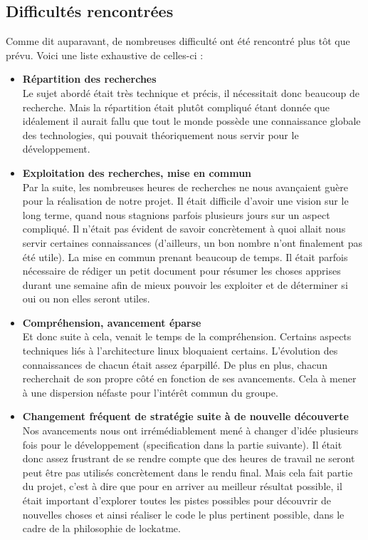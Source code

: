 \documentclass[french]{report}
\begin{document}
\subsection{Difficultés rencontrées}
Comme dit auparavant, de nombreuses difficulté ont été rencontré plus tôt que prévu.
Voici une liste exhaustive de celles-ci :

\vspace{0.5cm}
\begin{itemize}
  \item{\textbf{Répartition des recherches}}\\
Le sujet abordé était très technique et précis, il nécessitait donc beaucoup de
recherche. Mais la répartition était plutôt compliqué étant donnée que idéalement
il aurait fallu que tout le monde possède une connaissance globale des technologies,
qui pouvait théoriquement nous servir pour le développement.\\

  \item{\textbf{Exploitation des recherches, mise en commun}}\\
Par la suite, les nombreuses heures de recherches ne nous avançaient guère pour la
réalisation de notre projet. Il était difficile d'avoir une vision sur le long
terme, quand nous stagnions parfois plusieurs jours sur un aspect compliqué. Il
n'était pas évident de savoir concrètement à quoi allait nous servir certaines
connaissances (d'ailleurs, un bon nombre n'ont finalement pas été utile). La mise
en commun prenant beaucoup de temps. Il était parfois nécessaire de rédiger un
petit document pour résumer les choses apprises durant une semaine afin de mieux
pouvoir les exploiter et de déterminer si oui ou non elles seront utiles.\\

  \item{\textbf{Compréhension, avancement éparse}}\\
Et donc suite à cela, venait le temps de la compréhension. Certains aspects techniques
liés à l'architecture linux bloquaient certains. L'évolution des connaissances de
chacun était assez éparpillé. De plus en plus, chacun recherchait de son propre
côté en fonction de ses avancements. Cela à mener à une dispersion néfaste pour
l'intérêt commun du groupe.\\

  \item{\textbf{Changement fréquent de stratégie suite à de nouvelle découverte}}\\
Nos avancements nous ont irrémédiablement mené à changer d'idée plusieurs fois
pour le développement (specification dans la partie suivante). Il était donc assez
frustrant de se rendre compte que des heures de travail ne seront peut être pas
utilisés concrètement dans le rendu final. Mais cela fait partie du projet,
c'est à dire que pour en arriver au meilleur résultat possible, il était important
d'explorer toutes les pistes possibles pour découvrir de nouvelles choses et ainsi
réaliser le code le plus pertinent possible, dans le cadre de la philosophie de lockatme.\\


\end{itemize}
\end{document}
